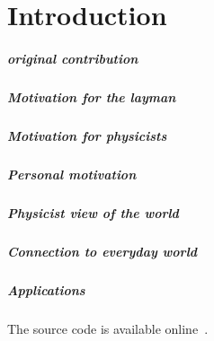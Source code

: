\chapter{Introduction}

\paragraph{original contribution}

\paragraph{Motivation for the layman}
\paragraph{Motivation for physicists}
\paragraph{Personal motivation}


\paragraph{Physicist view of the world}

\paragraph{Connection to everyday world}

\paragraph{Applications}

The source code is available online~\cite{SourceCode}.


